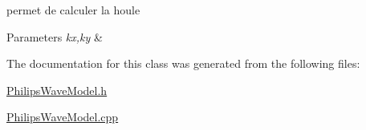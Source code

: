 permet de calculer la houle 


\begin{DoxyParams}{Parameters}
{\em kx,ky} & \\
\hline
\end{DoxyParams}


The documentation for this class was generated from the following files\-:\begin{DoxyCompactItemize}
\item 
\hyperlink{PhilipsWaveModel_8h}{Philips\-Wave\-Model.\-h}\item 
\hyperlink{PhilipsWaveModel_8cpp}{Philips\-Wave\-Model.\-cpp}\end{DoxyCompactItemize}
